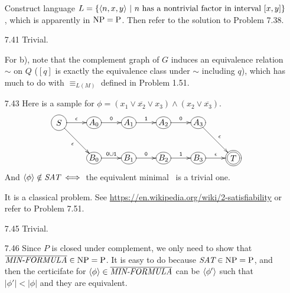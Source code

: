 \begin{itemize}
	\item[\Star 7.39]
	Construct language $L = \{ \Bra{n, x, y} \ | \ \text{$n$ has a nontrivial factor in interval $[x, y]$} \}$, which is apparently in $\NPoly = \Poly$. Then refer to the solution to Problem 7.38.
	
	\item[\Star 7.40] 
	\Omit
	
	\item[7.41]
	Trivial.
	
	\item[\Star 7.42]
	For b), note that the complement graph of $G$ induces an equivalence relation $\sim$ on $Q$ ($[q]$ is exactly the equivalence class under $\sim$ including $q$), which has much to do with $\equiv_{L(M)}$ defined in Problem 1.51.
	
	\item[7.43]
	Here is a sample for $\phi = (x_1 \vee \overline{x_2} \vee x_3) \wedge (x_2 \vee \overline{x_3})$.
	$$
	\xymatrix@R=2pc@C=2pc{
		*+<1pc>[o][F-]{S} \ar[r]^{\epsilon} \ar[rd]_{\epsilon} & 
		*+[o][F-]{A_0} \ar[r]^{\TT{0}} & 
		*+[o][F-]{A_1} \ar[r]^{\TT{1}} & 
		*+[o][F-]{A_2} \ar[r]^{\TT{0}} &
		*+[o][F-]{A_3} \ar[rd]^{\epsilon} \\ & 
		*+[o][F-]{B_0} \ar[r]^{\TT{0} \cup \TT{1}} & 
		*+[o][F-]{B_1} \ar[r]^{\TT{0}} & 
		*+[o][F-]{B_2} \ar[r]^{\TT{1}} &
		*+[o][F-]{B_3} \ar[r]^{\epsilon} &
		*+<1pc>[o][F=]{T}
	}
	$$
	And $\Bra{\phi} \notin \IT{SAT} \iff $ the equivalent minimal \NFA\ is a trivial one.
	
	\item[\Star 7.44]
	It is a classical problem. See \url{https://en.wikipedia.org/wiki/2-satisfiability} or refer to Problem 7.51.
	
	\item[7.45]
	Trivial.
	
	\item[7.46]
	Since $P$ is closed under complement, we only need to show that $\overline{\IT{MIN-FORMULA}} \in \NPoly = \Poly$. It is easy to do because $\IT{SAT} \in \NPoly = \Poly$, and then the certicifate for $\Bra{\phi} \in \overline{\IT{MIN-FORMULA}}$ can be $\Bra{\phi'}$ such that $|\phi'| < |\phi|$ and they are equivalent.
	

\end{itemize}
